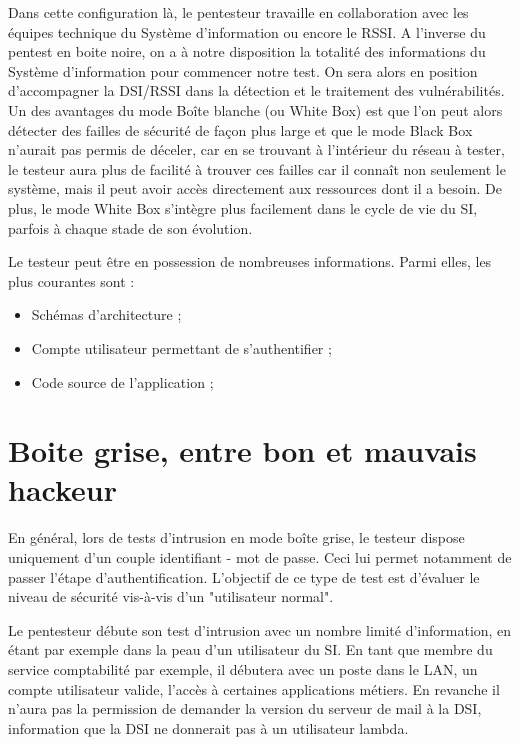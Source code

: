 \documentclass[a4paper]{memoir}
\begin{document}
Dans cette configuration là, le pentesteur travaille en collaboration avec les équipes technique du Système d'information ou encore le RSSI. A l'inverse du pentest en boite noire, on a à notre disposition la totalité des informations du Système d'information pour commencer notre test. On sera alors en position d'accompagner la DSI/RSSI dans la détection et le traitement des vulnérabilités.
Un des avantages du mode Boîte blanche (ou White Box) est que l’on peut alors détecter des failles de sécurité de façon plus large et que le mode Black Box n’aurait pas permis de déceler, car en se trouvant à l'intérieur du réseau à tester, le testeur aura plus de facilité à trouver ces failles car il connaît non seulement le système, mais il peut avoir accès directement aux ressources dont il a besoin. De plus, le mode White Box s’intègre plus facilement dans le cycle de vie du SI, parfois à chaque stade de son évolution. 


Le testeur peut être en possession de nombreuses informations. Parmi elles, les plus courantes sont :

\begin{itemize}
\item Schémas d'architecture ;
\item Compte utilisateur permettant de s'authentifier ;
\item Code source de l'application ;
\end{itemize}

\section{Boite grise, entre bon et mauvais hackeur}

En général, lors de tests d'intrusion en mode boîte grise, le testeur dispose uniquement d'un couple identifiant - mot de passe. Ceci lui permet notamment de passer l'étape d'authentification.
L'objectif de ce type de test est d'évaluer le niveau de sécurité vis-à-vis d'un "utilisateur normal".

Le pentesteur débute son test d’intrusion avec un nombre limité d’information, en étant par exemple dans la peau d’un utilisateur du SI. En tant que membre du service comptabilité par exemple, il débutera avec un poste dans le LAN, un compte utilisateur valide, l’accès à certaines applications métiers. En revanche il n’aura pas la permission de demander la version du serveur de mail à la DSI, information que la DSI ne donnerait pas à un utilisateur lambda.
\end{document}
